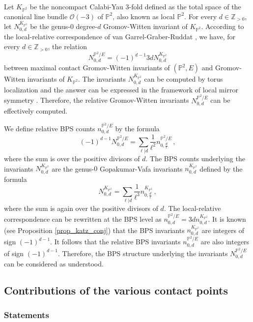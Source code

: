 \documentclass[11pt,letterpaper]{amsart}
\newcommand\PP{\mathbb P}
\newcommand\Z{\mathbb Z}
\newcommand\cO{\mathcal O}
\begin{document}
Let $K_{\PP^2}$ be the noncompact Calabi-Yau 3-fold defined as 
the total space of the canonical line bundle $\cO(-3)$ of $\PP^2$, also known as local $\PP^2$.
For every $d \in \Z_{>0}$, let $N_{0,d}^{K_{\PP^2}}$ be the genus-$0$ degree-$d$ Gromov-Witten invariant of 
$K_{\PP^2}$. According to the local-relative correspondence of van Garrel-Graber-Ruddat \cite{MR3948687}, we have, for every $d \in \Z_{>0}$, the relation
\[ N_{0,d}^{\PP^2/E}=(-1)^{d-1}3d N_{0,d}^{K_{\PP^2}}\]
between maximal contact Gromov-Witten invariants of $(\PP^2,E)$ and Gromov-Witten invariants of 
$K_{\PP^2}$.
The invariants $N_{0,d}^{K_{\PP^2}}$
can be computed by torus localization and the answer can be expressed in the framework of local mirror symmetry \cite{MR1797015}. 
Therefore, the relative Gromov-Witten invariants $N_{0,d}^{\PP^2/E}$ can be effectively computed.

We define relative BPS counts $n_{0,d}^{\PP^2/E}$ by the formula
\begin{equation} 
(-1)^{d-1} N_{0,d}^{\PP^2/E} 
=\sum_{\ell|d} \frac{1}{\ell^2} n_{0,\frac{d}{\ell}}^{\PP^2/E} \,,
\end{equation}
where the sum is over the positive divisors of $d$. The BPS counts underlying the 
invariants $N_{0,d}^{K_{\PP^2}}$ are the genus-$0$ Gopakumar-Vafa invariants $n_{0,d}^{K_{\PP^2}}$
defined by the formula
\begin{equation}
N_{0,d}^{K_{\PP^2}}=\sum_{\ell|d} \frac{1}{\ell^3}
n_{0,\frac{d}{\ell}}^{K_{\PP^2}}\,,
\end{equation}
where the sum is again over the positive divisors of $d$.
The local-relative correspondence can be rewritten at the BPS level as 
$n_{0,d}^{\PP^2/E}=3d n_{0,d}^{K_{\PP^2}}$. It is known
(see Proposition \ref{prop_katz_conj}) that the BPS invariants $n_{0,d}^{K_{\PP^2}}$ are integers of sign $(-1)^{d-1}$. 
It follows that the relative BPS invariants  $n_{0,d}^{\PP^2/E}$ are also integers of sign $(-1)^{d-1}$. Therefore, the BPS structure underlying the invariants $N_{0,d}^{\PP^2/E}$ can be considered as understood.



\subsection{Contributions of the various contact points}
\label{section_takahashi_intro}

\subsubsection{Statements}
\end{document}
